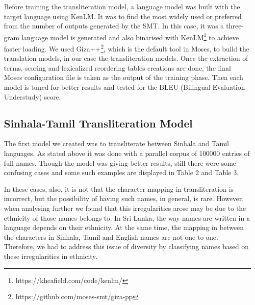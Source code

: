 \documentclass[10pt, a4paper, conference, compsocconf]{IEEEtran}
\begin{document}
Before training the transliteration model, a language model was built with the target language using KenLM. It was to find the most widely used or preferred from the number of outputs generated by the SMT. In this case, it was a three-gram language model is generated and also binarised with KenLM\footnote{https://kheafield.com/code/kenlm/} to achieve faster loading.  We used  Giza++\footnote{https://github.com/moses-smt/giza-pp}, which is the default tool in Moses, to build the translation models, in our case the transliteration models. Once the extraction of terms, scoring and lexicalized reordering tables creations are done, the final Moses configuration file is taken as the output of the training phase. Then each model is tuned for better results and tested for the BLEU (Bilingual Evaluation Understudy)  score.

\subsection{Sinhala-Tamil Transliteration Model	}

The first model we created was to transliterate  between Sinhala and Tamil languages. As stated above it was done with a parallel corpus of 100000 entries of full names. Though the model was giving better results, still there were some confusing cases and some such examples are displayed in Table 2 and Table 3. 

 In these cases, also, it is not that the character mapping in transliteration is incorrect, but the possibility of having such names, in general, is rare. 
However, when analysing further we found that this irregularities arose may be due to the ethnicity of those names belongs to. In Sri Lanka, the way names are written in a language depends on their ethnicity. At the same time, the mapping in between the characters in Sinhala, Tamil and English names are not one to one. Therefore, we had to address this issue of diversity by classifying names based on these irregularities in ethnicity.
	
\end{document}
